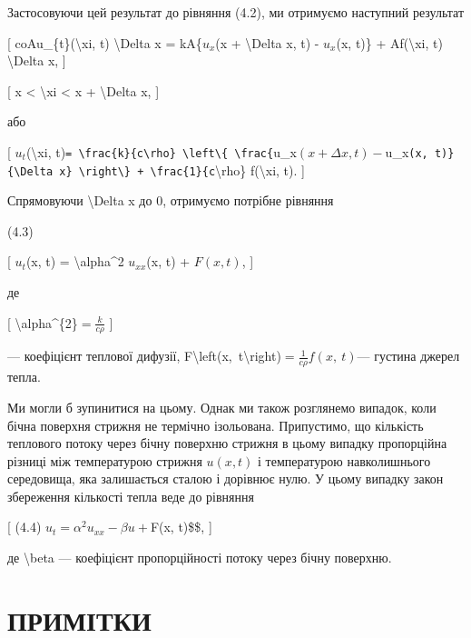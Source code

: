 \documentclass[
]{article}
\begin{document}
Застосовуючи цей результат до рівняння (4.2), ми отримуємо наступний
результат

{[} coAu\_\{t\}(\textbackslash xi, t) \textbackslash Delta x =
kA\{\(u_{x}\)(x + \textbackslash Delta x, t) - \(u_{x}\)(x, t)\} +
Af(\textbackslash xi, t) \textbackslash Delta x, {]}

{[} x \textless{} \textbackslash xi \textless{} x + \textbackslash Delta
x, {]}

або

{[} \(u_t\)(\textbackslash xi,
t)\texttt{=\ \textbackslash{}frac\{k\}\{c\textbackslash{}rho\}\ \textbackslash{}left\textbackslash{}\{\ \textbackslash{}frac\{}u\_x\((x + \Delta x, t) -\)u\_x\texttt{(x,\ t)\}\{\textbackslash{}Delta\ x\}\ \textbackslash{}right\textbackslash{}\}\ +\ \textbackslash{}frac\{1\}\{c}\textbackslash rho\}
f(\textbackslash xi, t). {]}

Спрямовуючи \textbackslash Delta x до 0, отримуємо потрібне рівняння

(4.3)

{[} \(u_t\)(x, t) = \textbackslash alpha\^{}2 \(u_{xx}\)(x, t) +
\(F(x, t)\), {]}

де

{[} \textbackslash alpha\^{}\{2\}\(=\frac{k}{c\rho}\) {]}

--- коефіцієнт теплової дифузії,
F\textbackslash left(x,~t\textbackslash right)\(=\frac{1}{c\rho}f\left(x,\ t\right)\)---
густина джерел тепла.

Ми могли б зупинитися на цьому. Однак ми також розглянемо випадок, коли
бічна поверхня стрижня не термічно ізольована. Припустимо, що кількість
теплового потоку через бічну поверхню стрижня в цьому випадку
пропорційна різниці між температурою стрижня \(u(x,t)\) і температурою
навколишнього середовища, яка залишається сталою і дорівнює нулю. У
цьому випадку закон збереження кількості тепла веде до рівняння

{[} (4.4) \(u_t = \alpha^2 u_{xx} - \beta u +\)F(x, t)\$\$, {]}

де \textbackslash beta --- коефіцієнт пропорційності потоку через бічну
поверхню.

\section{ПРИМІТКИ}\label{ux43fux440ux438ux43cux456ux442ux43aux438}
\end{document}
